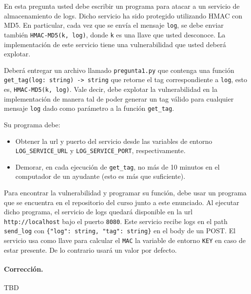 
En esta pregunta usted debe escribir un programa para atacar a un servicio de almacenamiento de logs. Dicho servicio ha sido protegido utilizando HMAC con MD5.
En particular, cada vez que se envía el mensaje \texttt{log}, se debe enviar también \texttt{HMAC-MD5(k, log)}, donde \texttt{k} es una llave que usted desconoce. La implementación de este servicio tiene una vulnerabilidad que usted deberá explotar.

Deberá entregar un archivo llamado \texttt{pregunta1.py} que contenga una función \texttt{get\_tag(log: string) -> string} que retorne el tag correspondiente a \texttt{log}, esto es, \texttt{HMAC-MD5(k, log)}. Vale decir, debe explotar la vulnerabilidad en la implementación de manera tal de poder generar un tag válido para cualquier mensaje \texttt{log} dado como parámetro a la función \texttt{get\_tag}.

Su programa debe:
\begin{itemize}
  \item Obtener la url y puerto del servicio desde las variables de entorno \texttt{LOG\_SERVICE\_URL} y \texttt{LOG\_SERVICE\_PORT}, respectivamente.
  \item Demorar, en cada ejecución de \texttt{get\_tag}, no más de 10 minutos en el computador de un ayudante (esto es más que suficiente).
\end{itemize}

Para encontrar la vulnerabilidad y programar su función, debe usar un programa que se encuentra en el repositorio del curso junto a este enunciado. Al ejecutar dicho programa, el servicio de logs quedará disponible en la url \texttt{http://localhost} bajo el puerto \texttt{8080}. Este servicio recibe logs en el path \texttt{send\_log} con \texttt{\{"log": string, "tag": string\}} en el body de un POST. El servicio usa como llave para calcular el \texttt{MAC} la variable de entorno \texttt{KEY} en caso de estar presente. De lo contrario usará un valor por defecto. 



\medskip

\paragraph{Corrección.} TBD
